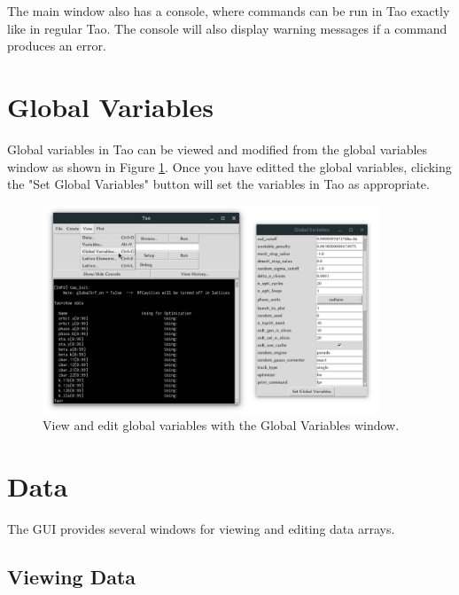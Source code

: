 The main window also has a console, where commands can be run in Tao exactly like in regular Tao.
The console will also display warning messages if a command produces an error.

\section{Global Variables}
\label{s:gui.global.variables}

Global variables in Tao can be viewed and modified from the global variables window as shown in Figure \ref{fig:gui.global.variables}.
Once you have editted the global variables, clicking the "Set Global Variables" button will set the variables in Tao as appropriate.

\begin{figure}
\centering
\includegraphics[width=10cm]{figures/globals.pdf}
\caption{View and edit global variables with the Global Variables window.}
\label{fig:gui.global.variables}
\end{figure}

\section{Data}
\label{s:gui.data}

The GUI provides several windows for viewing and editing data arrays.

\subsection{Viewing Data}
\label{s:gui.data.view}

